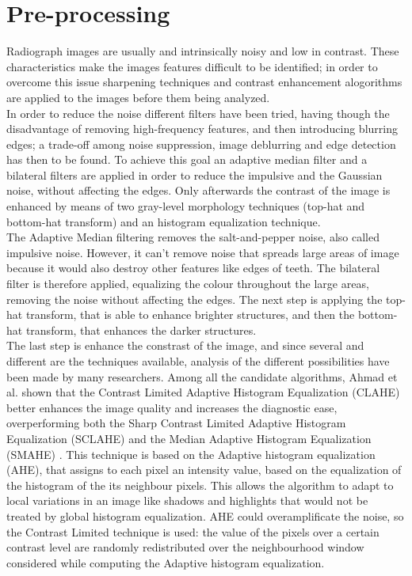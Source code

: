 \documentclass[a4paper]{article}
\begin{document}
\section{Pre-processing}
Radiograph images are usually and intrinsically noisy and low in contrast. These characteristics make the images features difficult to be identified; in order to overcome this issue sharpening techniques and contrast enhancement alogorithms are applied to the images before them being analyzed. \\
In order to reduce the noise different filters have been tried, having though the disadvantage of removing high-frequency features, and then introducing blurring edges; a trade-off among noise suppression, image deblurring and edge detection has then to be found. To achieve this goal an adaptive median filter and a bilateral filters are applied in order to reduce the impulsive and the Gaussian noise, without affecting the edges. Only afterwards the contrast of the image is enhanced by means of two gray-level morphology techniques (top-hat and bottom-hat transform) and an histogram equalization technique. \\
The Adaptive Median filtering removes the salt-and-pepper noise, also called impulsive noise. However, it can't remove noise that spreads large areas of image because it would also destroy other features like edges of teeth. The bilateral filter is therefore applied, equalizing the colour throughout the large areas, removing the noise without affecting the edges. The next step is applying the top-hat transform, that is able to enhance brighter structures, and then the bottom-hat transform, that enhances the darker structures. \\ 
The last step is enhance the constrast of the image, and since several and different are the techniques available, analysis of the different possibilities have been made by many researchers. Among all the candidate algorithms, Ahmad et al. shown that the Contrast Limited Adaptive Histogram Equalization (CLAHE) better enhances the image quality and increases the diagnostic ease, overperforming both the Sharp Contrast Limited Adaptive Histogram Equalization (SCLAHE) and the Median Adaptive Histogram Equalization (SMAHE) \cite{ahmad}. This technique is based on the Adaptive histogram equalization (AHE), that assigns to each pixel an intensity value, based on the equalization of the histogram of the its neighbour pixels. This allows the algorithm to adapt to local variations in an image like shadows and highlights that would not be treated by global histogram equalization. AHE could overamplificate the noise, so the Contrast Limited technique is used: the value of the pixels over a certain contrast level are randomly redistributed over the neighbourhood window considered while computing the Adaptive histogram equalization. 
\end{document}
